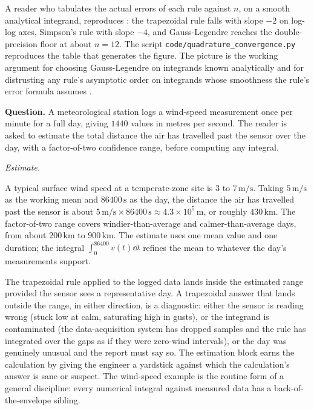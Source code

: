 A reader who tabulates the actual errors of each rule against $n$,
on a smooth analytical integrand, reproduces
: the trapezoidal rule
falls with slope $-2$ on log-log axes, Simpson's rule with slope
$-4$, and Gauss-Legendre reaches the double-precision floor at
about $n = 12$. The script
\texttt{code/quadrature\_convergence.py} reproduces the table that
generates the figure. The picture is the working argument for
choosing Gauss-Legendre on integrands known analytically and for
distrusting any rule's asymptotic order on integrands whose
smoothness the rule's error formula assumes
\cite{paper:v2ch06-trefethen-quadrature-2008}.



\begin{estimation}
\textbf{Question.} A meteorological station logs a wind-speed
measurement once per minute for a full day, giving $1440$ values
in metres per second. The reader is asked to estimate the total
distance the air has travelled past the sensor over the day, with
a factor-of-two confidence range, before computing any integral.

\smallskip
\textit{Estimate.}

\smallskip
A typical surface wind speed at a temperate-zone site is $3$ to
$7\,\text{m/s}$. Taking $5\,\text{m/s}$ as the working mean and
$86400\,\text{s}$ as the day, the distance the air has travelled
past the sensor is about $5\,\text{m/s} \times 86400\,\text{s}
\approx 4.3 \times 10^{5}\,\text{m}$, or roughly $430\,\text{km}$.
The factor-of-two range covers windier-than-average and
calmer-than-average days, from about $200\,\text{km}$ to
$900\,\text{km}$. The estimate uses one mean value and one
duration; the integral $\int_{0}^{86400} v(t) \dd t$ refines the
mean to whatever the day's measurements support.

The trapezoidal rule applied to the logged data lands inside the
estimated range provided the sensor sees a representative day. A
trapezoidal answer that lands outside the range, in either
direction, is a diagnostic: either the sensor is reading wrong
(stuck low at calm, saturating high in gusts), or the integrand
is contaminated (the data-acquisition system has dropped samples
and the rule has integrated over the gaps as if they were
zero-wind intervals), or the day was genuinely unusual and the
report must say so. The estimation block earns the calculation by
giving the engineer a yardstick against which the calculation's
answer is sane or suspect. The wind-speed example is the routine
form of a general discipline: every numerical integral against
measured data has a back-of-the-envelope sibling.
\end{estimation}


